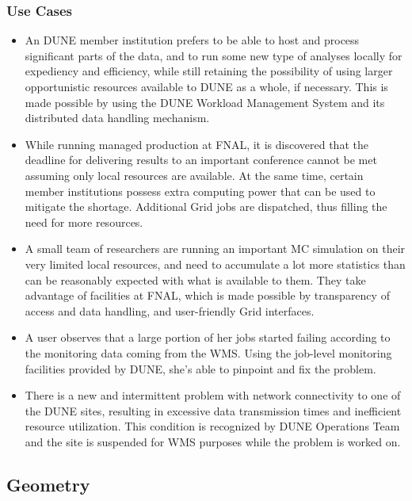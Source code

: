 \subsubsection{Use Cases}
\begin{itemize}
	\item  An  DUNE member institution prefers to be able to host and process significant parts of the data,
	and to run some new type of analyses locally for expediency and efficiency, while still retaining the possibility
	of using larger opportunistic resources available to DUNE as a whole, if necessary. This is made possible by
	using the DUNE Workload Management System and its distributed data handling mechanism.
	
	\item  While running managed production at FNAL, it is discovered that the deadline for delivering results
	to an important conference cannot be met assuming only local resources are available. At the same time,
	certain member institutions possess extra computing power that can be used to mitigate the shortage.
	Additional Grid jobs are dispatched, thus filling the need for more resources.
	
	\item A small team of researchers are running an important MC simulation on their very limited local resources,
	and need to accumulate a lot more statistics than can be reasonably expected with what is available to them.
	They take advantage of facilities at FNAL, which is made possible by transparency of access and data handling,
	and user-friendly Grid interfaces.
	
	\item A user observes that a large portion of her jobs started failing according to the monitoring data coming from
	the WMS. Using the job-level monitoring facilities provided by DUNE, she's able to pinpoint and fix the problem.
	
	\item There is a new and intermittent problem with network connectivity to one of the DUNE sites, resulting in
	excessive data transmission times and inefficient resource utilization. This condition is recognized by DUNE
	Operations Team and the site is suspended for WMS purposes while the problem is worked on.
\end{itemize}

\newpage
\subsection{Geometry}
